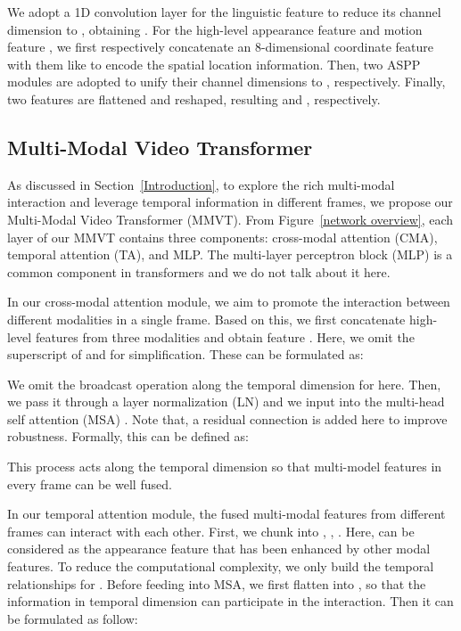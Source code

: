 \documentclass[10pt,twocolumn,letterpaper]{article}
\begin{document}
We adopt a 1D convolution layer for the linguistic feature to reduce its channel dimension to , obtaining . For the high-level appearance feature  and motion feature , we first respectively concatenate an 8-dimensional coordinate feature  with them like \cite{wang2019asymmetric} to encode the spatial location information. Then, two ASPP modules \cite{chen2017rethinking} are adopted to unify their channel dimensions to , respectively. Finally, two features are flattened and reshaped, resulting   and , respectively. 


\vspace{-2mm}
\subsection{Multi-Modal Video Transformer} \label{MMVT}
\vspace{-2mm}
As discussed in Section~\ref{Introduction}, to explore the rich multi-modal interaction and leverage temporal information in different frames, we propose our Multi-Modal Video Transformer (MMVT). From Figure~\ref{network overview}, each layer of our MMVT contains three components: cross-modal attention (CMA), temporal attention (TA), and MLP. The multi-layer perceptron block (MLP) is a common component in transformers \eg \cite{vaswani2017attention, dosovitskiy2020image} and we do not talk about it here.

In our cross-modal attention module, we aim to promote the interaction between different modalities in a single frame. Based on this, we first concatenate high-level features from three modalities and obtain feature . Here,  we omit the superscript of  and  for simplification. These can be formulated as:


We omit the broadcast operation along the temporal dimension for  here. Then, we pass it through a layer normalization (LN) \cite{ba2016layer} and we input  into the multi-head self attention (MSA) \cite{vaswani2017attention}. Note that, a residual connection is added here to improve robustness. Formally, this can be defined as:
\vspace{-1mm}

This process acts along the temporal dimension so that multi-model features in every frame can be well fused. 

In our temporal attention module, the fused multi-modal features from different frames can interact with each other. First, we chunk  into , , . Here,  can be considered as the appearance feature that has been enhanced by other modal features. To reduce the computational complexity, we only build the temporal relationships for . Before feeding into MSA, we first flatten  into , so that the information in temporal dimension can participate in the interaction. Then it can be formulated as follow:
\end{document}
